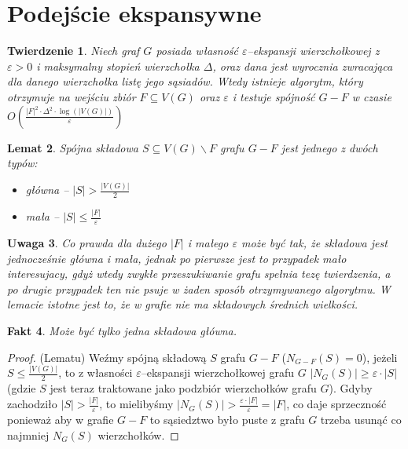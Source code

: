 \documentclass{pracamgr}
\newtheorem{theorem}{Twierdzenie}
\newtheorem{lemma}[theorem]{Lemat}
\newtheorem{remark}[theorem]{Uwaga}
\newtheorem{fact}[theorem]{Fakt}
\begin{document}
  \section{Podejście ekspansywne}\label{podejscie ekspansywne}
   \begin{theorem}\label{Spójność ekspansywna}
    Niech graf $G$ posiada własność $\varepsilon$--ekspansji wierzchołkowej z $\varepsilon>0$ i maksymalny stopień wierzchołka $\Delta$,
    oraz dana jest wyrocznia zwracająca dla danego wierzchołka listę jego sąsiadów.
    Wtedy istnieje algorytm, który otrzymuje na wejściu zbiór $F\subseteq V(G)$ oraz $\varepsilon$
    i testuje spójność $G-F$ w czasie $O\left(\frac{|F|^2\cdot\Delta^2\cdot\log(|V(G)|)}{\varepsilon}\right)$
   \end{theorem}
   \begin{lemma}\label{klasyfikacja skladowych}
    Spójna składowa $S\subseteq V(G)\backslash F$ grafu $G-F$ jest jednego z dwóch typów:
    \begin{itemize}
     \item główna -- $|S|>\frac{|V(G)|}{2}$
     \item mała -- $|S|\le\frac{|F|}{\varepsilon}$
    \end{itemize}
   \end{lemma}
   \begin{remark}\label{klasyfikacja skladowych 2}
    Co prawda dla dużego $|F|$ i małego $\varepsilon$ może być tak, że składowa jest jednocześnie główna i mała, jednak po pierwsze jest to przypadek mało
    interesujacy, gdyż wtedy zwykłe przeszukiwanie grafu spełnia tezę twierdzenia, a po drugie przypadek ten nie psuje w żaden sposób otrzymywanego algorytmu.
    W lemacie istotne jest to, że w grafie nie ma składowych średnich wielkości.
   \end{remark}
   \begin{fact}\label{jedna glowna skladowa}
    Może być tylko jedna składowa główna.
   \end{fact}
   \begin{proof}
    (Lematu)\newline
    Weźmy spójną składową $S$ grafu $G-F$ ($N_{G-F}(S)=0$), jeżeli $S\le\frac{|V(G)|}{2}$, to z własności $\varepsilon$--ekspansji wierzchołkowej grafu $G$
    $|N_G(S)|\ge\varepsilon\cdot|S|$ (gdzie $S$ jest teraz traktowane jako podzbiór wierzchołków grafu $G$). Gdyby zachodziło $|S|>\frac{|F|}{\varepsilon}$,
    to mielibyśmy $|N_G(S)|>\frac{\varepsilon\cdot|F|}{\varepsilon}=|F|$, co daje sprzeczność ponieważ aby w grafie $G-F$ to sąsiedztwo było puste z grafu
    $G$ trzeba usunąć co najmniej $N_G(S)$ wierzchołków.
   \end{proof}
\end{document}
